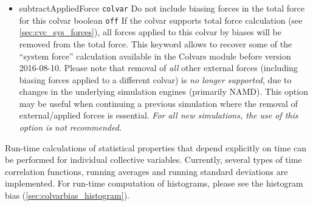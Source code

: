 
\begin{itemize}

\item %
  \keydef
    {subtractAppliedForce}{%
    \texttt{colvar}}{%
    Do not include biasing forces in the total force for this colvar}{%
    boolean}{%
    \texttt{off}}{%
    If the colvar supports total force calculation (see \ref{sec:cvc_sys_forces}), all forces applied to this colvar by biases will be removed from the total force.
    This keyword allows to recover some of the ``system force'' calculation available in the Colvars module     before version 2016-08-10.
    Please note that removal of \emph{all} other external forces (including biasing forces applied to a         different colvar) is \emph{no longer supported}, due to changes in the underlying simulation engines (primarily NAMD).
    This option may be useful when continuing a previous simulation where the removal of external/applied forces is essential.
    \emph{For all new simulations, the use of this option is not recommended.}
}

\end{itemize}



Run-time calculations of statistical properties that depend explicitly on time can be performed for individual collective variables.
Currently, several types of time correlation functions, running averages and running standard deviations are implemented.
For run-time computation of histograms, please see the histogram bias (\ref{sec:colvarbias_histogram}).

